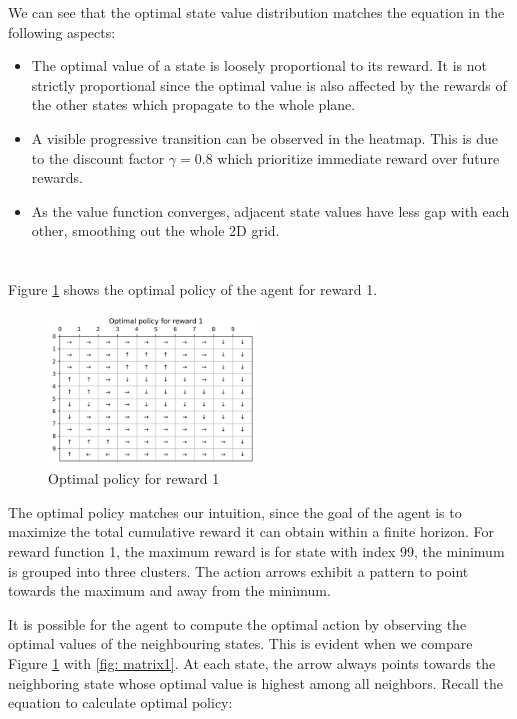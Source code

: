 We can see that the optimal state value distribution matches the equation in the following aspects:

\begin{itemize}
    \item The optimal value of a state is loosely proportional to its reward. It is not strictly proportional since the optimal value is also affected by the rewards of the other states which propagate to the whole plane.
    \item A visible progressive transition can be observed in the heatmap. This is due to the discount factor $\gamma=0.8$ which prioritize immediate reward over future rewards.
    \item As the value function converges, adjacent state values have less gap with each other, smoothing out the whole 2D grid.
\end{itemize}
\newpage

\section{}\label{sec:5}
Figure \ref{fig: policy1} shows the optimal policy of the agent for reward 1.

\begin{figure}[!htb]
\centering
  \includegraphics[width=0.49\textwidth]{images/Q1-9/Optimal-policy-for-reward-1.png}
  \caption{Optimal policy for reward 1}
\label{fig: policy1}
\end{figure}

The optimal policy matches our intuition, since the goal of the agent is to maximize the total cumulative reward it can obtain within a finite horizon. For reward function 1, the maximum reward is for state with index 99, the minimum is grouped into three clusters. The action arrows exhibit a pattern to point towards the maximum and away from the minimum.

It is possible for the agent to compute the optimal action by observing the optimal values of the neighbouring states. This is evident when we compare Figure \ref{fig: policy1} with \ref{fig: matrix1}. At each state, the arrow always points towards the neighboring state whose optimal value is highest among all neighbors. Recall the equation to calculate optimal policy:

